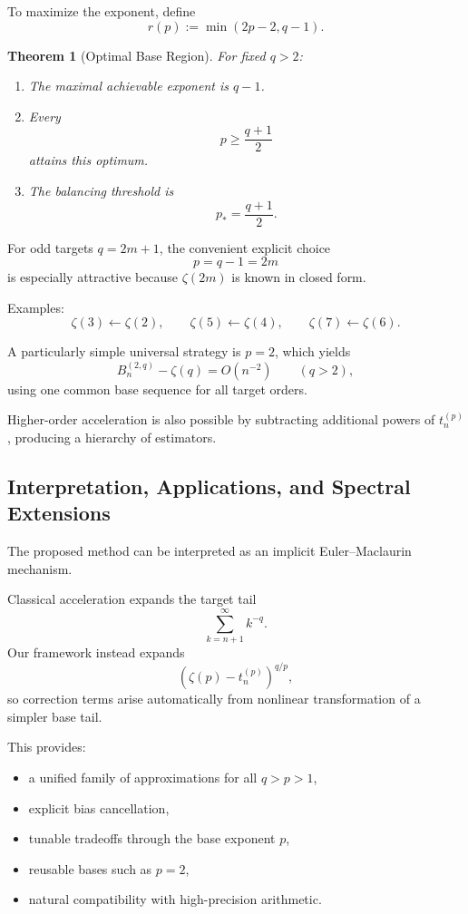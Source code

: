 \documentclass[11pt]{article}
\numberwithin{equation}{section}
\newtheorem{theorem}{Theorem}[section]
\theoremstyle{definition}
\begin{document}
To maximize the exponent, define
\[
r(p):=\min(2p-2,q-1).
\]

\begin{theorem}[Optimal Base Region]
\label{thm:optimal}
For fixed \(q>2\):

\begin{enumerate}
\item The maximal achievable exponent is \(q-1\).
\item Every
\[
p\ge \frac{q+1}{2}
\]
attains this optimum.
\item The balancing threshold is
\[
\boxed{
p_*=\frac{q+1}{2}.
}
\]
\end{enumerate}
\end{theorem}

For odd targets \(q=2m+1\), the convenient explicit choice
\[
p=q-1=2m
\]
is especially attractive because \(\zeta(2m)\) is known in closed form.

Examples:
\[
\zeta(3)\leftarrow \zeta(2),\qquad
\zeta(5)\leftarrow \zeta(4),\qquad
\zeta(7)\leftarrow \zeta(6).
\]

A particularly simple universal strategy is \(p=2\), which yields
\[
B_n^{(2,q)}-\zeta(q)=O(n^{-2})
\qquad(q>2),
\]
using one common base sequence for all target orders.

Higher-order acceleration is also possible by subtracting additional powers of \(t_n^{(p)}\), producing a hierarchy of estimators.

\subsection{Interpretation, Applications, and Spectral Extensions}

The proposed method can be interpreted as an implicit Euler--Maclaurin mechanism.

Classical acceleration expands the target tail
\[
\sum_{k=n+1}^{\infty}k^{-q}.
\]
Our framework instead expands
\[
(\zeta(p)-t_n^{(p)})^{q/p},
\]
so correction terms arise automatically from nonlinear transformation of a simpler base tail.

This provides:

\begin{itemize}
\item a unified family of approximations for all \(q>p>1\),
\item explicit bias cancellation,
\item tunable tradeoffs through the base exponent \(p\),
\item reusable bases such as \(p=2\),
\item natural compatibility with high-precision arithmetic.
\end{itemize}
\end{document}
